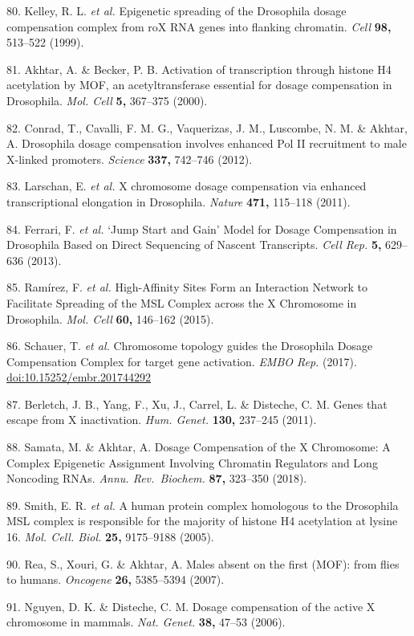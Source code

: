 \documentclass[11pt,twoside]{MPIthesis}
\theoremstyle{definition}
\theoremstyle{definition}
\theoremstyle{definition}
\theoremstyle{remark}
\begin{document}
80. Kelley, R. L. \emph{et al.} Epigenetic spreading of the Drosophila
dosage compensation complex from roX RNA genes into flanking chromatin.
\emph{Cell} \textbf{98,} 513--522 (1999).

81. Akhtar, A. \& Becker, P. B. Activation of transcription through
histone H4 acetylation by MOF, an acetyltransferase essential for dosage
compensation in Drosophila. \emph{Mol. Cell} \textbf{5,} 367--375
(2000).

82. Conrad, T., Cavalli, F. M. G., Vaquerizas, J. M., Luscombe, N. M. \&
Akhtar, A. Drosophila dosage compensation involves enhanced Pol II
recruitment to male X-linked promoters. \emph{Science} \textbf{337,}
742--746 (2012).

83. Larschan, E. \emph{et al.} X chromosome dosage compensation via
enhanced transcriptional elongation in Drosophila. \emph{Nature}
\textbf{471,} 115--118 (2011).

84. Ferrari, F. \emph{et al.} `Jump Start and Gain' Model for Dosage
Compensation in Drosophila Based on Direct Sequencing of Nascent
Transcripts. \emph{Cell Rep.} \textbf{5,} 629--636 (2013).

85. Ramírez, F. \emph{et al.} High-Affinity Sites Form an Interaction
Network to Facilitate Spreading of the MSL Complex across the X
Chromosome in Drosophila. \emph{Mol. Cell} \textbf{60,} 146--162 (2015).

86. Schauer, T. \emph{et al.} Chromosome topology guides the Drosophila
Dosage Compensation Complex for target gene activation. \emph{EMBO Rep.}
(2017). \url{doi:10.15252/embr.201744292}

87. Berletch, J. B., Yang, F., Xu, J., Carrel, L. \& Disteche, C. M.
Genes that escape from X inactivation. \emph{Hum. Genet.} \textbf{130,}
237--245 (2011).

88. Samata, M. \& Akhtar, A. Dosage Compensation of the X Chromosome: A
Complex Epigenetic Assignment Involving Chromatin Regulators and Long
Noncoding RNAs. \emph{Annu. Rev.~Biochem.} \textbf{87,} 323--350 (2018).

89. Smith, E. R. \emph{et al.} A human protein complex homologous to the
Drosophila MSL complex is responsible for the majority of histone H4
acetylation at lysine 16. \emph{Mol. Cell. Biol.} \textbf{25,}
9175--9188 (2005).

90. Rea, S., Xouri, G. \& Akhtar, A. Males absent on the first (MOF):
from flies to humans. \emph{Oncogene} \textbf{26,} 5385--5394 (2007).

91. Nguyen, D. K. \& Disteche, C. M. Dosage compensation of the active X
chromosome in mammals. \emph{Nat. Genet.} \textbf{38,} 47--53 (2006).
\end{document}
